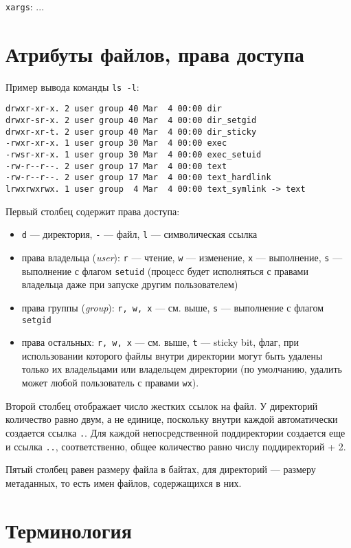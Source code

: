 \documentclass[listings]{labreport}
\begin{document}
\texttt{xargs}: ...

\section*{Атрибуты файлов, права доступа}

Пример вывода команды \texttt{ls -l}:

\begin{verbatim}
drwxr-xr-x. 2 user group 40 Mar  4 00:00 dir
drwxr-sr-x. 2 user group 40 Mar  4 00:00 dir_setgid
drwxr-xr-t. 2 user group 40 Mar  4 00:00 dir_sticky
-rwxr-xr-x. 1 user group 30 Mar  4 00:00 exec
-rwsr-xr-x. 1 user group 30 Mar  4 00:00 exec_setuid
-rw-r--r--. 2 user group 17 Mar  4 00:00 text
-rw-r--r--. 2 user group 17 Mar  4 00:00 text_hardlink
lrwxrwxrwx. 1 user group  4 Mar  4 00:00 text_symlink -> text
\end{verbatim}

Первый столбец содержит права доступа:
\begin{itemize}
\item \texttt{d} — директория, \texttt{-} — файл, \texttt{l} — символическая ссылка
\item права владельца (\textit{user}): \texttt{r} — чтение, \texttt{w} — изменение, \texttt{x} — выполнение,
  \texttt{s} — выполнение с флагом \texttt{setuid} (процесс будет исполняться с правами владельца даже при запуске другим пользователем)
\item права группы (\textit{group}): \texttt{r, w, x} — см. выше, \texttt{s} — выполнение с флагом \texttt{setgid}
\item права остальных: \texttt{r, w, x} — см. выше, \texttt{t} — sticky bit, флаг, при использовании которого файлы внутри директории
  могут быть удалены только их владельцами или владельцем директории (по умолчанию, удалить может любой пользователь с правами \texttt{wx}).
\end{itemize}

Второй столбец отображает число жестких ссылок на файл. У директорий количество равно двум, а не единице, поскольку внутри
каждой автоматически создается ссылка \texttt{.}. Для каждой непосредственной поддиректории создается еще и ссылка \texttt{..},
соответственно, общее количество равно числу поддиректорий + 2.

Пятый столбец равен размеру файла в байтах, для директорий — размеру метаданных, то есть имен файлов, содержащихся в них.

\section*{Терминология}
\end{document}
